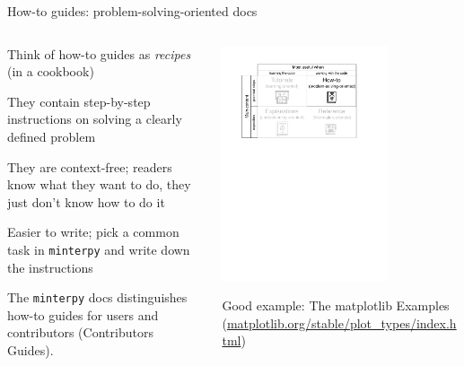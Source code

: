 \documentclass[english,aspectratio=169]{beamer}
\let\tempone\itemize
\let\temptwo\enditemize
\renewenvironment{itemize}{\tempone\addtolength{\itemsep}{0.35\baselineskip}}{\temptwo}
\begin{document}
\begin{frame}{How-to guides: problem-solving-oriented docs}
\footnotesize

\begin{columns}[onlytextwidth]

\begin{column}{0.4\textwidth}

\begin{itemize}
    \item Think of how-to guides as \emph{recipes} (in a cookbook)
    \item They contain step-by-step instructions on solving a clearly defined problem
    \item They are context-free; readers know what they want to do,
          they just don't know how to do it
    \item Easier to write; pick a common task in \texttt{minterpy}
          and write down the instructions
\end{itemize}

The \texttt{minterpy} docs distinguishes how-to guides
for users and contributors (Contributors Guides).

\end{column}

\begin{column}{0.6\textwidth}
    \begin{center}
    \includegraphics[width=0.7\textwidth]{./figures/documentation-system-how-to}
    \end{center}
    \begin{exampleblock}{}
        \centering
        Good example: The matplotlib Examples
        (\url{matplotlib.org/stable/plot_types/index.html})
    \end{exampleblock}
\end{column}

\end{columns}

\end{frame}
\end{document}

